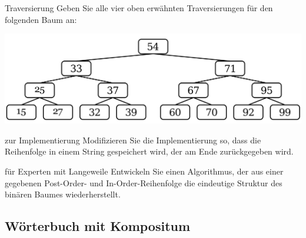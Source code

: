 \documentclass{article}
\begin{document}
\begin{task}{Traversierung}
Geben Sie alle vier oben erwähnten Traversierungen für den folgenden Baum an:
\begin{center}
    \includegraphics[scale=0.2]{../../media/traversal_task.png}
\end{center}
\end{task}
\begin{task}{zur Implementierung}
Modifizieren Sie die Implementierung so, dass die Reihenfolge in einem String gespeichert wird, der am Ende zurückgegeben wird. 
\end{task}
\begin{task}{für Experten mit Langeweile}
Entwickeln Sie einen Algorithmus, der aus einer gegebenen Post-Order- und In-Order-Reihenfolge die eindeutige Struktur des binären Baumes wiederherstellt. 
\end{task}

\newpage 
\subsection{Wörterbuch mit Kompositum}
\end{document}

